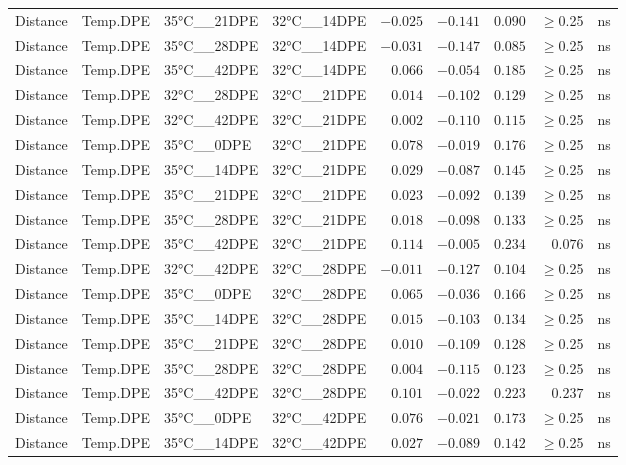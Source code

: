 \documentclass[
]{article}
\begin{document}
\begin{longtable}{llllrrrrl}
Distance & Temp.DPE & 35°C\_\_21DPE & 32°C\_\_14DPE & $-0.025$ & $-0.141$ & $0.090$ & $\geq$0.25 & ns \\ 
Distance & Temp.DPE & 35°C\_\_28DPE & 32°C\_\_14DPE & $-0.031$ & $-0.147$ & $0.085$ & $\geq$0.25 & ns \\ 
Distance & Temp.DPE & 35°C\_\_42DPE & 32°C\_\_14DPE & $0.066$ & $-0.054$ & $0.185$ & $\geq$0.25 & ns \\ 
Distance & Temp.DPE & 32°C\_\_28DPE & 32°C\_\_21DPE & $0.014$ & $-0.102$ & $0.129$ & $\geq$0.25 & ns \\ 
Distance & Temp.DPE & 32°C\_\_42DPE & 32°C\_\_21DPE & $0.002$ & $-0.110$ & $0.115$ & $\geq$0.25 & ns \\ 
Distance & Temp.DPE & 35°C\_\_0DPE & 32°C\_\_21DPE & $0.078$ & $-0.019$ & $0.176$ & $\geq$0.25 & ns \\ 
Distance & Temp.DPE & 35°C\_\_14DPE & 32°C\_\_21DPE & $0.029$ & $-0.087$ & $0.145$ & $\geq$0.25 & ns \\ 
Distance & Temp.DPE & 35°C\_\_21DPE & 32°C\_\_21DPE & $0.023$ & $-0.092$ & $0.139$ & $\geq$0.25 & ns \\ 
Distance & Temp.DPE & 35°C\_\_28DPE & 32°C\_\_21DPE & $0.018$ & $-0.098$ & $0.133$ & $\geq$0.25 & ns \\ 
Distance & Temp.DPE & 35°C\_\_42DPE & 32°C\_\_21DPE & $0.114$ & $-0.005$ & $0.234$ & $0.076$ & ns \\ 
Distance & Temp.DPE & 32°C\_\_42DPE & 32°C\_\_28DPE & $-0.011$ & $-0.127$ & $0.104$ & $\geq$0.25 & ns \\ 
Distance & Temp.DPE & 35°C\_\_0DPE & 32°C\_\_28DPE & $0.065$ & $-0.036$ & $0.166$ & $\geq$0.25 & ns \\ 
Distance & Temp.DPE & 35°C\_\_14DPE & 32°C\_\_28DPE & $0.015$ & $-0.103$ & $0.134$ & $\geq$0.25 & ns \\ 
Distance & Temp.DPE & 35°C\_\_21DPE & 32°C\_\_28DPE & $0.010$ & $-0.109$ & $0.128$ & $\geq$0.25 & ns \\ 
Distance & Temp.DPE & 35°C\_\_28DPE & 32°C\_\_28DPE & $0.004$ & $-0.115$ & $0.123$ & $\geq$0.25 & ns \\ 
Distance & Temp.DPE & 35°C\_\_42DPE & 32°C\_\_28DPE & $0.101$ & $-0.022$ & $0.223$ & $0.237$ & ns \\ 
Distance & Temp.DPE & 35°C\_\_0DPE & 32°C\_\_42DPE & $0.076$ & $-0.021$ & $0.173$ & $\geq$0.25 & ns \\ 
Distance & Temp.DPE & 35°C\_\_14DPE & 32°C\_\_42DPE & $0.027$ & $-0.089$ & $0.142$ & $\geq$0.25 & ns \\ 

\end{longtable}
\end{document}
